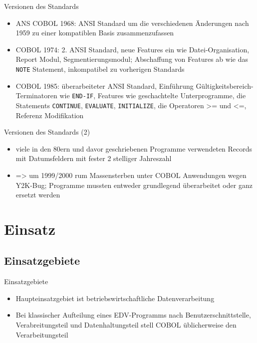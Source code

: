\documentclass[handout]{beamer}
\begin{document}
\begin{frame}{Versionen des Standards}
	\begin{itemize}
		\item
			ANS COBOL 1968: ANSI Standard um die verschiedenen \"Anderungen nach 1959 zu einer kompatiblen Basis zusammenzufassen
		\item
			COBOL 1974: 2. ANSI Standard, neue Features ein wie Datei-Organisation, Report Modul, Segmentierungsmodul; Abschaffung von Features ab wie das \texttt{NOTE} Statement, inkompatibel zu vorherigen Standards
		\item
			COBOL 1985: \"uberarbeiteter ANSI Standard, Einf\"uhrung G\"ultigkeitsbereich-Terminatoren wie \texttt{END-IF}, Features wie geschachtelte Unterprogramme, die Statements \texttt{CONTINUE}, \texttt{EVALUATE}, \texttt{INITIALIZE}, die Operatoren >= und <=, Referenz Modifikation
	\end{itemize}
\end{frame}

\begin{frame}{Versionen des Standards (2)}
		\begin{itemize}
			\item
				viele in den 80ern und davor geschriebenen Programme verwendeten Records mit Datumsfeldern mit fester 2 stelliger Jahreszahl
			\item
				=> um 1999/2000 rum Massensterben unter COBOL Anwendungen wegen Y2K-Bug; Programme mussten entweder grundlegend überarbeitet oder ganz ersetzt werden 
		\end{itemize}
\end{frame}

\section{Einsatz}

\subsection{Einsatzgebiete}

\begin{frame}{Einsatzgebiete}
	\begin{itemize}
		\item
			Haupteinsatzgebiet ist betriebswirtschaftliche Datenverarbeitung
		\item
			Bei klassischer Aufteilung eines EDV-Programms nach Benutzerschnittstelle, Verabreitungsteil und Datenhaltungsteil stell COBOL \"ublicherweise den Verarbeitungsteil
	\end{itemize}
\end{frame}
\end{document}
